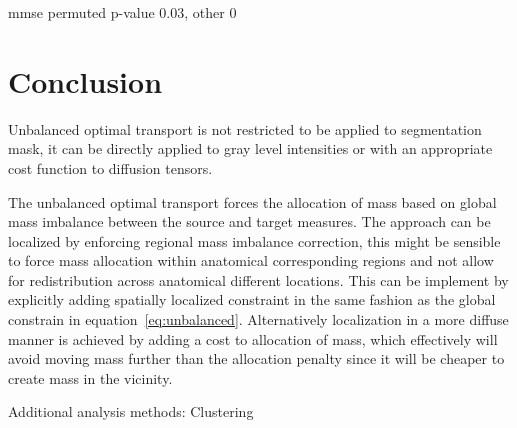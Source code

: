 \documentclass{llncs}
\begin{document}
mmse permuted p-value 0.03, other 0

\section{Conclusion}

Unbalanced optimal transport is not restricted to be applied to segmentation
mask, it can be directly applied to gray level intensities or with an
appropriate cost function to diffusion tensors. 

The unbalanced optimal transport forces the allocation of mass based on global
mass imbalance between the source and target measures. The approach can be
localized by enforcing regional mass imbalance correction, this might be
sensible to force mass allocation within anatomical corresponding regions and
not allow for redistribution across anatomical different locations. This can be
implement by explicitly adding spatially localized constraint in the same
fashion as the global constrain in equation~\ref{eq:unbalanced}. Alternatively
localization in a more diffuse manner is achieved by adding a cost to
allocation of mass, which effectively will avoid moving mass further than the
allocation penalty since it will be cheaper to create mass in the vicinity.

Additional analysis methods: Clustering



\end{document}
